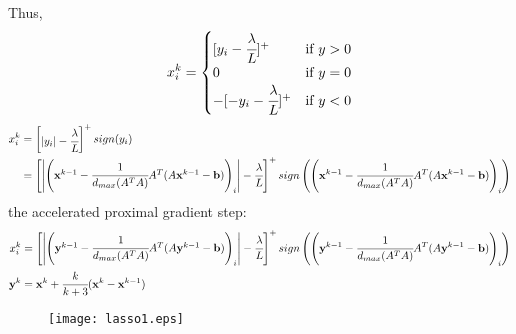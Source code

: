 \documentclass[paper=a4, fontsize=11pt]{scrartcl} %
\numberwithin{equation}{section} %
\numberwithin{figure}{section} %
\numberwithin{table}{section} %
\begin{document}
Thus,
\begin{equation}
x_i^k = 
\begin{cases}
[y_i-\cfrac{\lambda}{L}]^+ &\mbox{if} \  y>0 \\
0 &\mbox{if} \  y = 0 \\
-[-y_i-\cfrac{\lambda}{L}]^+ &\mbox{if} \  y<0
\end{cases}
\end{equation}
\begin{equation}
\begin{split}
x_i^k &=\begin{bmatrix} |y_i| - \cfrac{\lambda}{L}\end{bmatrix}^+sign(y_i)\\
 &= \left[ \begin{vmatrix}
\left( \mathbf{x}^{k-1}-\cfrac{1}{d_{max}(A^TA)}A^T(A\mathbf{x}^{k-1}-\mathbf{b}) \right)_i
\end{vmatrix}  - \cfrac{\lambda}{L}\right] ^+ sign\left( \left( \mathbf{x}^{k-1}-\cfrac{1}{d_{max}(A^TA)}A^T(A\mathbf{x}^{k-1}-\mathbf{b}) \right)_i \right)
\end{split}
\end{equation}
the accelerated proximal gradient step:
\begin{equation}
\begin{split}
x_i^k &= \left[ \begin{vmatrix}
\left( \mathbf{y}^{k-1}-\cfrac{1}{d_{max}(A^TA)}A^T(A\mathbf{y}^{k-1}-\mathbf{b}) \right)_i
\end{vmatrix}  - \cfrac{\lambda}{L}\right] ^+ sign\left( \left( \mathbf{y}^{k-1}-\cfrac{1}{d_{max}(A^TA)}A^T(A\mathbf{y}^{k-1}-\mathbf{b}) \right)_i \right)\\
\mathbf{y}^k &= \mathbf{x}^{k} + \cfrac{k}{k+3}(\mathbf{x}^k - \mathbf{x}^{k-1})
\end{split}
\end{equation}
\begin{figure}[htb!]
\centering
\texttt{[image: lasso1.eps]}
\end{figure}
\end{document}
